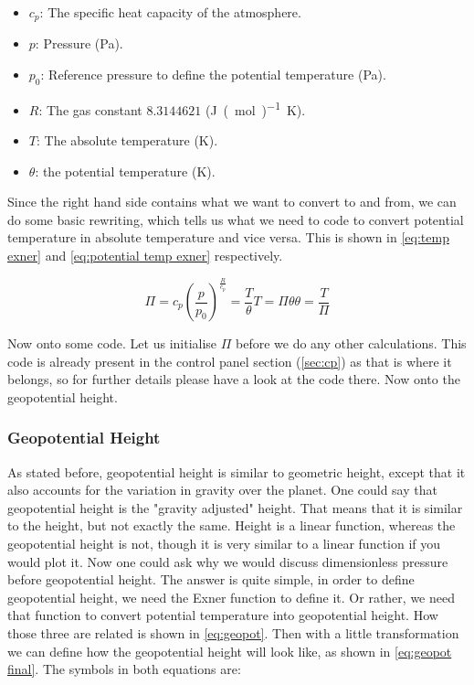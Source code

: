 \begin{itemize}
    \item $c_p$: The specific heat capacity of the atmosphere.
    \item $p$: Pressure (\si{Pa}).
    \item $p_0$: Reference pressure to define the potential temperature (\si{Pa}).
    \item $R$: The gas constant $8.3144621$ (\si{J(mol)^{-1}K}).
    \item $T$: The absolute temperature (\si{K}).
    \item $\theta$: the potential temperature (\si{K}).
\end{itemize}

Since the right hand side contains what we want to convert to and from, we can do some basic rewriting, which tells us what we need to code to convert potential temperature in absolute 
temperature and vice versa. This is shown in \autoref{eq:temp exner} and \autoref{eq:potential temp exner} respectively.

\begin{subequations}
    \begin{equation}
        \label{eq:exner}
        \Pi = c_p(\frac{p}{p_0})^{\frac{R}{c_p}} = \frac{T}{\theta}
    \end{equation}
    \begin{equation}
        \label{eq:temp exner}
        T = \Pi\theta
    \end{equation}
    \begin{equation}
        \label{eq:potential temp exner}
        \theta = \frac{T}{\Pi}
    \end{equation}
\end{subequations}

Now onto some code. Let us initialise $\Pi$ before we do any other calculations. This code is already present in the control panel section (\autoref{sec:cp}) as that is where it belongs, so for 
further details please have a look at the code there. Now onto the geopotential height. 

\subsubsection{Geopotential Height}
As stated before, geopotential height is similar to geometric height, except that it also accounts for the variation in gravity over the planet. One could say that geopotential height is the 
"gravity adjusted" height. That means that it is similar to the height, but not exactly the same. Height is a linear function, whereas the geopotential height is not, though it is very similar 
to a linear function if you would plot it. Now one could ask why we would discuss dimensionless pressure before geopotential height. The answer is quite simple, in order to define geopotential 
height, we need the Exner function to define it. Or rather, we need that function to convert potential temperature into geopotential height. How those three are related is shown in 
\autoref{eq:geopot}. Then with a little transformation we can define how the geopotential height will look like, as shown in \autoref{eq:geopot final}. The symbols in both equations are:

